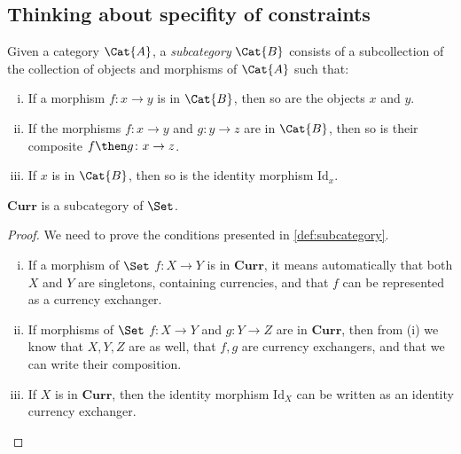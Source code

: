 \subsection{Thinking about specifity of constraints}
\begin{shaded}
\begin{definition}[Subcategory]
\label{def:subcategory}
	Given a category $\Cat{A}$, a \emph{subcategory} $\Cat{B}$ consists of a subcollection of the collection of objects and morphisms of $\Cat{A}$ such that:
	\begin{enumerate}[(i)]
	\item If a morphism $f \colon x\to y$ is in $\Cat{B}$, then so are the objects $x$ and $y$.
	\item If the morphisms $f\colon x\to y$ and $g\colon y\to z$ are in $\Cat{B}$, then so is their composite $f\then g\colon x\to z$.
	\item If $x$ is in $\Cat{B}$, then so is the identity morphism $\text{Id}_x$.
	\end{enumerate}
\end{definition}
\end{shaded}

\begin{lemma}
    $\mathbf{Curr}$ is a subcategory of $\Set$.
\end{lemma}

\begin{proof}
    We need to prove the conditions presented in \cref{def:subcategory}.
    \begin{enumerate}[(i)]
        \item If a morphism of $\Set$ $f\colon X\to Y$ is in $\mathbf{Curr}$, it means automatically that both $X$ and $Y$ are singletons, containing currencies, and that $f$ can be represented as a currency exchanger.
        \item If morphisms of $\Set$ $f\colon X\to Y$ and $g\colon Y \to Z$ are in $\mathbf{Curr}$, then from (i) we know that $X,Y,Z$ are as well, that $f,g$ are currency exchangers, and that we can write their composition.
        \item If $X$ is in $\mathbf{Curr}$, then the identity morphism $\text{Id}_X$ can be written as an identity currency exchanger.
    \end{enumerate}
\end{proof}